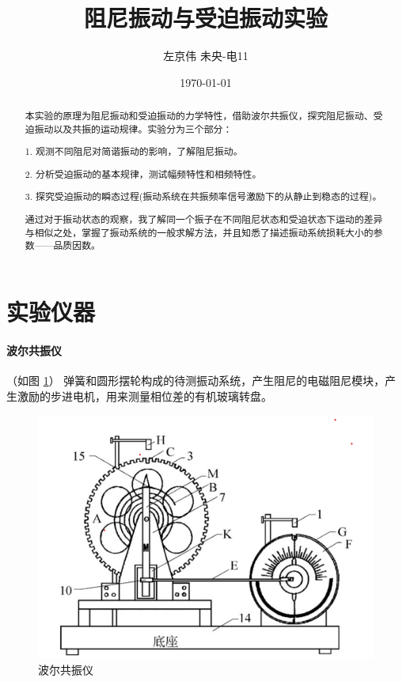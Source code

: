 \documentclass[a4paper,11pt]{article}
\title{阻尼振动与受迫振动实验}
\author{左京伟 \qquad 未央-电11 \qquad 2021012328}
\date{\today}
\begin{document}
\maketitle
\begin{abstract}
    本实验的原理为阻尼振动和受迫振动的力学特性，借助波尔共振仪，探究阻尼振动、受迫振动以及共振的运动规律。实验分为三个部分：
    
    1. 观测不同阻尼对简谐振动的影响，了解阻尼振动。

    2. 分析受迫振动的基本规律，测试幅频特性和相频特性。

    3. 探究受迫振动的瞬态过程(振动系统在共振频率信号激励下的从静止到稳态的过程)。

    通过对于振动状态的观察，我了解同一个振子在不同阻尼状态和受迫状态下运动的差异与相似之处，掌握了振动系统的一般求解方法，并且知悉了描述振动系统损耗大小的参数——品质因数。

\end{abstract}

\section{实验仪器}
\paragraph{波尔共振仪}
    （如图 \ref{pic1}）
    弹簧和圆形摆轮构成的待测振动系统，产生阻尼的电磁阻尼模块，产生激励的步进电机，用来测量相位差的有机玻璃转盘。
    \begin{figure}[ht]
        \centering
        \includegraphics[scale=0.3]{Bohr.png}
        \caption{波尔共振仪}
        \label{pic1}
    \end{figure}
\end{document}
